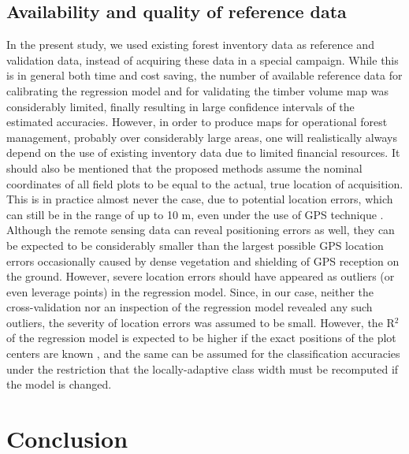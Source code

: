 \subsection{Availability and quality of reference data}
\label{sec:refdata}

In the present study, we used existing forest inventory data as reference and validation data, instead of acquiring these data in a special campaign. While this is in general both time and cost saving, the number of available reference data for calibrating the regression model and for validating the timber volume map was considerably limited, finally resulting in large confidence intervals of the estimated accuracies. However, in order to produce maps for operational forest management, probably over considerably large areas, one will realistically always depend on the use of existing inventory data due to limited financial resources. It should also be mentioned that the proposed methods assume the nominal coordinates of all field plots to be equal to the actual, true location of acquisition. This is in practice almost never the case, due to potential location errors, which can still be in the range of up to 10 m, even under the use of GPS technique \citep{mauro2010, steinmann2013}. Although the remote sensing data can reveal positioning errors as well, they can be expected to be considerably smaller than the largest possible GPS location errors occasionally caused by dense vegetation and shielding of GPS reception on the ground. However, severe location errors should have appeared as outliers (or even leverage points) in the regression model. Since, in our case, neither the cross-validation nor an inspection of the regression model revealed any such outliers, the severity of location errors was assumed to be small. However, the R$^2$ of the regression model is expected to be higher if the exact positions of the plot centers are known \citep{fuller2009}, and the same can be assumed for the classification accuracies under the restriction that the locally-adaptive class width must be recomputed if the model is changed.



\section{Conclusion}
\label{sec:conc}

